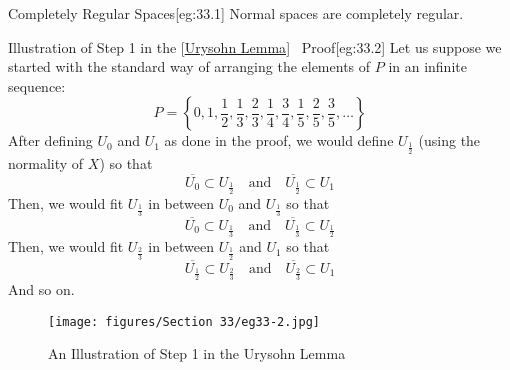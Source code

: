 \begin{egBox}{Completely Regular Spaces}[eg:33.1]
    Normal spaces are completely regular.
\end{egBox}

\begin{egBox}{Illustration of Step 1 in the [\hyperlink{thm:33.1}{Urysohn Lemma}] \ 
    Proof}[eg:33.2]
    Let us suppose we started with the standard way of arranging the elements of \( P \)
    in an infinite sequence:
    \begin{equation*}
        P
        =
        \left\{
            0, 1, \frac{ 1 }{ 2 }, \frac{ 1 }{ 3 }, \frac{ 2 }{ 3 },
            \frac{ 1 }{ 4 }, \frac{ 3 }{ 4 }, \frac{ 1 }{ 5 }, \frac{ 2 }{ 5 },
            \frac{ 3 }{ 5 }, \ldots
        \right\}
    \end{equation*}
    After defining \( U_{ 0 } \) and \( U_{ 1 } \) as done in the proof, we would
    define \( U_{ \frac{ 1 }{ 2 } } \) (using the normality of \( X \)) so that 
    \begin{equation*}
        \overline{ U_{ 0 } } \subset U_{ \frac{ 1 }{ 2 } }
        \quad \mathrm{and} \quad 
        \overline{ U_{ \frac{ 1 }{ 2 } } } \subset U_{ 1 }
    \end{equation*}
    Then, we would fit \( U_{ \frac{ 1 }{ 3 } } \) in between \( U_{ 0 } \) and 
    \( U_{ \frac{ 1 }{ 3 } } \) so that 
    \begin{equation*}
        \overline{ U_{ 0 } } \subset U_{ \frac{ 1 }{ 3 } }
        \quad \mathrm{and} \quad 
        \overline{ U_{ \frac{ 1 }{ 3 } } } \subset U_{ \frac{ 1 }{ 2 } }
    \end{equation*}
    Then, we would fit \( U_{ \frac{ 2 }{ 3 } } \) in between 
    \( U_{ \frac{ 1 }{ 2 } } \) and \( U_{ 1 } \) so that 
    \begin{equation*}
        \overline{ U_{ \frac{ 1 }{ 2 } } } \subset U_{ \frac{ 2 }{ 3 } }
        \quad \mathrm{and} \quad 
        \overline{ U_{ \frac{ 2 }{ 3 } } } \subset U_{ 1 }
    \end{equation*}
    And so on.

    \begin{figure}[H]
        \centering
        \texttt{[image: figures/Section 33/eg33-2.jpg]}
        \caption{An Illustration of Step 1 in the Urysohn Lemma}
        \label{fig:33-1}
    \end{figure}
\end{egBox}